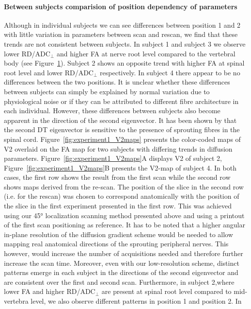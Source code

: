 \begin{figure}
  \centering
  \label{fig:experiment1_meanDTI}
\end{figure}

\paragraph{Between subjects comparision of position dependency of parameters} Although in individual subjects we can see differences between position 1 and 2 with little variation in parameters between scan and rescan, we find that these trends are not consistent between subjects. In subject 1 and subject 3 we observe lower RD/ADC$_\perp$ and higher FA at nerve root level compared to the vertebral body (see Figure~\ref{fig:experiment1_meanDTI}). Subject 2 shows an opposite trend with higher FA at spinal root level and lower RD/ADC$_\perp$ respectively. In subject 4 there appear to be no differences between the two positions. It is unclear whether these differences between subjects can simply be explained by normal variation due to physiological noise or if they can be attributed to different fibre architecture in each individual. However, these differences between subjects also become apparent in the direction of the second eigenvector. It has been shown by \citet{Mamata:2006} that the second DT eigenvector is sensitive to the presence of sprouting fibres in the spinal cord. Figure~\ref{fig:experiment1_V2maps} presents the color-coded maps of V2 overlaid on the FA map for two subjects with differing trends in diffusion parameters. Figure~\ref{fig:experiment1_V2maps}A displays V2 of subject 2, Figure~\ref{fig:experiment1_V2maps}B presents the V2-map of subject 4. In both cases, the first row shows the result from the first scan while the second row shows maps derived from the re-scan. The position of the slice in the second row (i.e. for the rescan) was chosen to correspond anatomically with the position of the slice in the first experiment presented in the first row. This was achieved using our 45° localization scanning method presented above and using a printout of the first scan positioning as reference. It has to be noted that a higher angular in-plane resolution of the diffusion gradient scheme would be needed to allow mapping real anatomical directions of the sprouting peripheral nerves. This however, would increase the number of acquisitions needed and therefore further increase the scan time. Moreover, even with our low-resolution scheme, distinct patterns emerge in each subject in the directions of the second eigenvector and are consistent over the first and second scan. Furthermore, in subject 2,where lower FA and higher RD/ADC$_\perp$ are present at spinal root level compared to mid-vertebra level, we also observe different patterns in position 1 and position 2. In 